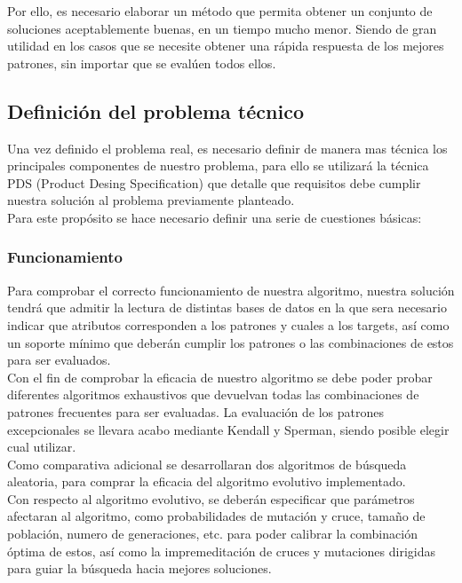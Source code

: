 \documentclass[a4paper, 12pt]{book}
\begin{document}
Por ello, es necesario elaborar un método que permita obtener un conjunto de soluciones aceptablemente buenas, en un tiempo mucho menor. Siendo de gran utilidad en los casos que se necesite obtener una rápida respuesta de los mejores patrones, sin importar que se evalúen todos ellos. 

\subsection{Definición del problema técnico}

Una vez definido el problema real, es necesario definir de manera mas técnica los principales componentes de nuestro problema, para ello se utilizará la técnica PDS (Product Desing Specification) que detalle que requisitos debe cumplir nuestra solución al problema previamente planteado.\\

Para este propósito se hace necesario definir una serie de cuestiones básicas:

\subsubsection{Funcionamiento}

Para comprobar el correcto funcionamiento de nuestra algoritmo, nuestra solución tendrá que admitir la lectura de distintas bases de datos en la que sera necesario indicar que atributos corresponden a los patrones y cuales a los targets, así como un soporte mínimo que deberán cumplir los patrones o las combinaciones de estos para ser evaluados.\\

Con el fin de comprobar la eficacia de nuestro algoritmo se debe poder probar diferentes algoritmos exhaustivos que devuelvan todas las combinaciones de patrones frecuentes para ser evaluadas. La evaluación de los patrones excepcionales se llevara acabo mediante Kendall y Sperman, siendo posible elegir cual utilizar.\\

Como comparativa adicional se desarrollaran dos algoritmos de búsqueda aleatoria, para comprar la eficacia del algoritmo evolutivo implementado.\\

Con respecto al algoritmo evolutivo, se deberán especificar que parámetros afectaran al algoritmo, como probabilidades de mutación y cruce, tamaño de población, numero de generaciones, etc. para poder calibrar la combinación óptima de estos, así como la impremeditación de cruces y mutaciones dirigidas para guiar la búsqueda hacia mejores soluciones.
\end{document}
